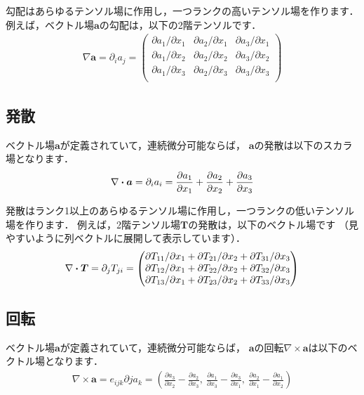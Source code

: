勾配はあらゆるテンソル場に作用し，一つランクの高いテンソル場を作ります．
例えば，ベクトル場$\bm{a}$の勾配は，以下の2階テンソルです．
\begin{align}
 \label{eq:2.3}
 \nabla\bm{a} = \partial_{i}a_{j} =
 \begin{pmatrix}
  \partial a_{1}/\partial x_{1} & \partial a_{2}/\partial x_{1} & \partial a_{3}/\partial x_{1} \\
  \partial a_{1}/\partial x_{2} & \partial a_{2}/\partial x_{2} & \partial a_{3}/\partial x_{2} \\
  \partial a_{1}/\partial x_{3} & \partial a_{2}/\partial x_{3} & \partial a_{3}/\partial x_{3} \\
 \end{pmatrix}
\end{align}


\subsection{発散}
\label{ssec:2.1.2}
ベクトル場$\bm{a}$が定義されていて，連続微分可能ならば，
$\bm{a}$の発散は以下のスカラ場となります．
\begin{align}
 \label{eq:2.4}
 \nabla \inProd \bm{a} = \partial_{i}a_{i}
 = \frac{\partial a_{1}}{\partial x_{1}}
 + \frac{\partial a_{2}}{\partial x_{2}}
 + \frac{\partial a_{3}}{\partial x_{3}}
\end{align}

発散はランク1以上のあらゆるテンソル場に作用し，一つランクの低いテンソル場を作ります．
例えば，2階テンソル場$\bm{T}$の発散は，以下のベクトル場です
（見やすいように列ベクトルに展開して表示しています）．
\begin{align}
 \label{eq:2.5}
 \nabla \inProd \bm{T} = \partial_{j}T_{ji} =
 \begin{pmatrix}
  \partial T_{11}/\partial x_{1} + \partial T_{21}/\partial x_{2} + \partial T_{31}/\partial x_{3} \\
  \partial T_{12}/\partial x_{1} + \partial T_{22}/\partial x_{2} + \partial T_{32}/\partial x_{3} \\
  \partial T_{13}/\partial x_{1} + \partial T_{23}/\partial x_{2} + \partial T_{33}/\partial x_{3} \\
 \end{pmatrix}
\end{align}


\subsection{回転}
\label{ssec:2.1.3}
ベクトル場$\bm{a}$が定義されていて，連続微分可能ならば，
$\bm{a}$の回転$\nabla \times \bm{a}$は以下のベクトル場となります．
\begin{align}
 \label{eq:2.6}
 \nabla \times \bm{a} = e_{ijk}\partial{j}a_{k}
 = \left(\frac{\partial a_{3}}{\partial x_{2}} - \frac{\partial a_{2}}{\partial x_{3}},\
 \frac{\partial a_{1}}{\partial x_{3}} - \frac{\partial a_{3}}{\partial x_{1}},\
 \frac{\partial a_{2}}{\partial x_{1}} - \frac{\partial a_{1}}{\partial x_{2}}\right)
\end{align}

